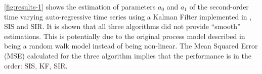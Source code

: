 \documentclass{article}
\begin{document}
\cref{fig:results-1} shows the estimation of parameters $a_0$ and $a_1$ of the second-order time varying auto-regressive time series using a Kalman Filter implemented in \cite{lab2ans}, SIS and SIR. It is shown that all three algorithms did not provide ``smooth'' estimations. This is potentially due to the original process model described in \cite{lab2} being a random walk model instead of being non-linear. The Mean Squared Error (MSE) calculated for the three algorithm implies that the performance is in the order: SIS, KF, SIR.

\end{document}
